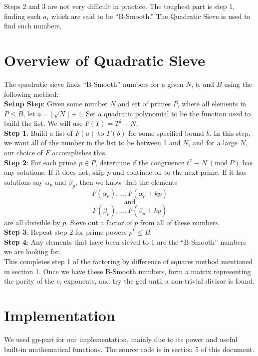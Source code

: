 \documentclass[titlepage]{article}
\newcommand{\Mod}[1]{\ (\text{mod}\ #1)}
\begin{document}
	\noindent Steps 2 and 3 are not very difficult in practice. The toughest part is step 1, finding such $a_i$ which are said to be ``B-Smooth.'' The Quadratic Sieve is used to find such numbers.

	\section{Overview of Quadratic Sieve}
	The quadratic sieve finds ``B-Smooth'' numbers for a given $N$, $b$, and $B$ using the following method: \\

		\noindent\textbf{Setup Step}: Given some number $N$ and set of primes $P$, where all elements in $P \leq B$, let $a=\lfloor\sqrt{N}\rfloor+1$. Set a quadratic polynomial to be the function used to build the list. We will use $F(T) = T^2 - N$.\\

		\noindent\textbf{Step 1}: Build a list of $F(a)$ to $F(b)$ for some specified bound $b$. In this step, we want all of the number in the list to be between 1 and $N$, and for a large $N$, our choice of $F$ accomplishes this. \\

		\noindent\textbf{Step 2}: For each prime $p \in P$, determine if the congruence $t^2 \equiv N \Mod{P}$ has any solutions. If it does not, skip $p$ and continue on to the next prime. If it has solutions say $\alpha_p$ and $\beta_p$, then we know that the elements $$F(\alpha_p), ... , F(\alpha_p+kp)$$ $$\text{and}$$ $$F(\beta_p), ... , F(\beta_p+kp)$$ are all divisible by $p$. Sieve out a factor of $p$ from all of these numbers. \\
	
		\noindent\textbf{Step 3}: Repeat step 2 for prime powers $p^k \leq B$. \\

		\noindent\textbf{Step 4}: Any elements that have been sieved to 1 are the ``B-Smooth'' numbers we are looking for. \\
		
		\noindent This completes step 1 of the factoring by difference of squares method mentioned in section 1. Once we have these B-Smooth numbers, form a matrix representing the parity of the $c_i$ exponents, and try the gcd until a non-trivial divisor is found.
	  
	\section{Implementation}
	We used gp-pari for our implementation, mainly due to its power and useful built-in mathematical functions. The source code is in section 5 of this document.
	
\end{document}
